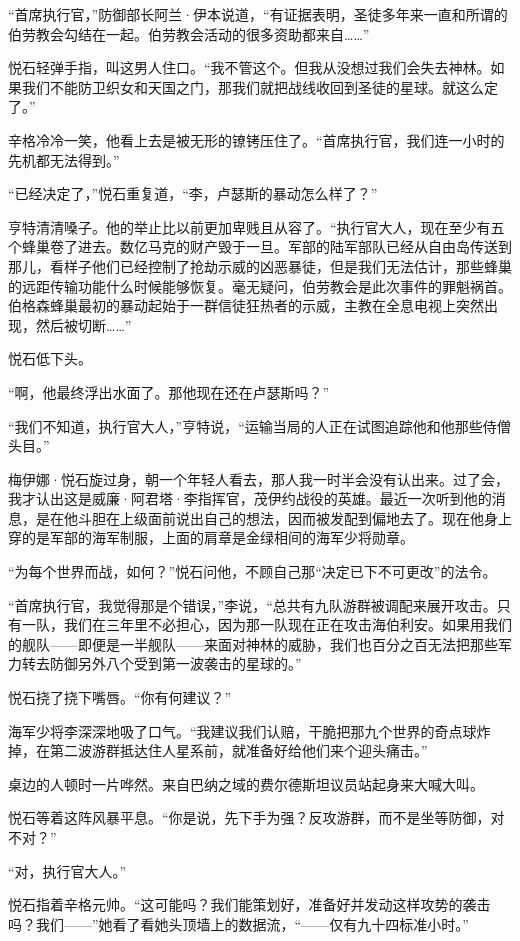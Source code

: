 \documentclass[AutoFakeBold=true]{book}
\begin{document}
``首席执行官，''防御部长阿兰·伊本说道，``有证据表明，圣徒多年来一直和所谓的伯劳教会勾结在一起。伯劳教会活动的很多资助都来自……''

悦石轻弹手指，叫这男人住口。``我不管这个。但我从没想过我们会失去神林。如果我们不能防卫织女和天国之门，那我们就把战线收回到圣徒的星球。就这么定了。''

辛格冷冷一笑，他看上去是被无形的镣铐压住了。``首席执行官，我们连一小时的先机都无法得到。''

``已经决定了，''悦石重复道，``李，卢瑟斯的暴动怎么样了？''

亨特清清嗓子。他的举止比以前更加卑贱且从容了。``执行官大人，现在至少有五个蜂巢卷了进去。数亿马克的财产毁于一旦。军部的陆军部队已经从自由岛传送到那儿，看样子他们已经控制了抢劫示威的凶恶暴徒，但是我们无法估计，那些蜂巢的远距传输功能什么时候能够恢复。毫无疑问，伯劳教会是此次事件的罪魁祸首。伯格森蜂巢最初的暴动起始于一群信徒狂热者的示威，主教在全息电视上突然出现，然后被切断……''

悦石低下头。

``啊，他最终浮出水面了。那他现在还在卢瑟斯吗？''

``我们不知道，执行官大人，''亨特说，``运输当局的人正在试图追踪他和他那些侍僧头目。''

梅伊娜·悦石旋过身，朝一个年轻人看去，那人我一时半会没有认出来。过了会，我才认出这是威廉·阿君塔·李指挥官，茂伊约战役的英雄。最近一次听到他的消息，是在他斗胆在上级面前说出自己的想法，因而被发配到偏地去了。现在他身上穿的是军部的海军制服，上面的肩章是金绿相间的海军少将勋章。

``为每个世界而战，如何？''悦石问他，不顾自己那``决定已下不可更改''的法令。

``首席执行官，我觉得那是个错误，''李说，``总共有九队游群被调配来展开攻击。只有一队，我们在三年里不必担心，因为那一队现在正在攻击海伯利安。如果用我们的舰队——即便是一半舰队——来面对神林的威胁，我们也百分之百无法把那些军力转去防御另外八个受到第一波袭击的星球的。''

悦石挠了挠下嘴唇。``你有何建议？''

海军少将李深深地吸了口气。``我建议我们认赔，干脆把那九个世界的奇点球炸掉，在第二波游群抵达住人星系前，就准备好给他们来个迎头痛击。''

桌边的人顿时一片哗然。来自巴纳之域的费尔德斯坦议员站起身来大喊大叫。

悦石等着这阵风暴平息。``你是说，先下手为强？反攻游群，而不是坐等防御，对不对？''

``对，执行官大人。''

悦石指着辛格元帅。``这可能吗？我们能策划好，准备好并发动这样攻势的袭击吗？我们——''她看了看她头顶墙上的数据流，``——仅有九十四标准小时。''
\end{document}
